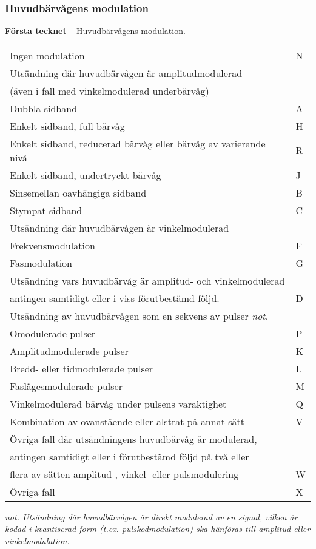 \subsubsection{Huvudbärvågens modulation}
\textbf{Första tecknet} -- Huvudbärvågens modulation.\\
\begin{tabular}{ll}
	Ingen modulation & N\\
	Utsändning där huvudbärvågen är amplitudmodulerad &\\
	(även i fall med vinkelmodulerad underbärvåg) &\\
	Dubbla sidband & A\\
	Enkelt sidband, full bärvåg & H\\
	Enkelt sidband, reducerad bärvåg eller bärvåg av varierande nivå & R\\
	Enkelt sidband, undertryckt bärvåg & J\\
	Sinsemellan oavhängiga sidband & B\\
	Stympat sidband & C\\
	Utsändning där huvudbärvågen är vinkelmodulerad &\\
	Frekvensmodulation & F\\
	Fasmodulation & G\\
	Utsändning vars huvudbärvåg är amplitud- och vinkelmodulerad &\\
	antingen samtidigt eller i viss förutbestämd följd. & D\\
	Utsändning av huvudbärvågen som en sekvens av pulser \emph{not}. &\\
	Omodulerade pulser & P \\
	Amplitudmodulerade pulser & K\\
	Bredd- eller tidmodulerade pulser & L\\
	Faslägesmodulerade pulser & M\\
	Vinkelmodulerad bärvåg under pulsens varaktighet & Q\\
	Kombination av ovanstående eller alstrat på annat sätt & V\\
	Övriga fall där utsändningens huvudbärvåg är modulerad, &\\
	antingen samtidigt eller i förutbestämd följd på två eller &\\
	flera av sätten amplitud-, vinkel- eller pulsmodulering & W\\
	Övriga fall & X\\
\end{tabular}

\emph{not. Utsändning där huvudbärvågen är direkt modulerad av en signal,
	vilken är kodad i kvantiserad form (t.ex. pulskodmodulation) ska hänföras till
	amplitud eller vinkelmodulation.}

